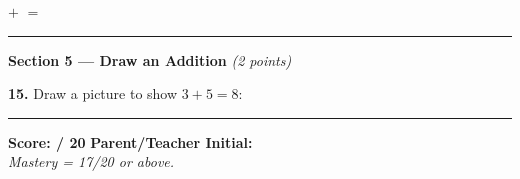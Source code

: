 \documentclass[12pt, letterpaper]{article}
\newcommand{\answerline}{\underline{\hspace{2.5cm}}}
\newcommand{\numbox}{\fbox{\hspace{0.6cm}\vphantom{0}}}
\begin{document}
\medskip
\hspace{2em} \numbox \; $+$ \; \numbox \; $=$ \; \numbox

\bigskip
\noindent\textcolor{scholared}{\rule{\linewidth}{0.4pt}}

\noindent\textcolor{scholared}{\large\textbf{Section 5 — Draw an Addition}} \hfill \textit{(2 points)}

\bigskip
\noindent\textbf{15.} Draw a picture to show $3 + 5 = 8$:

\begin{center}
\end{center}

\bigskip
\noindent\textcolor{scholared}{\rule{\linewidth}{1pt}}

\begin{scorebox}
\begin{center}
\large\textbf{Score: \answerline / 20} \hspace{2cm}
\textbf{Parent/Teacher Initial: \answerline}\\[6pt]
\small\textit{Mastery = 17/20 or above.}
\end{center}
\end{scorebox}
\end{document}
